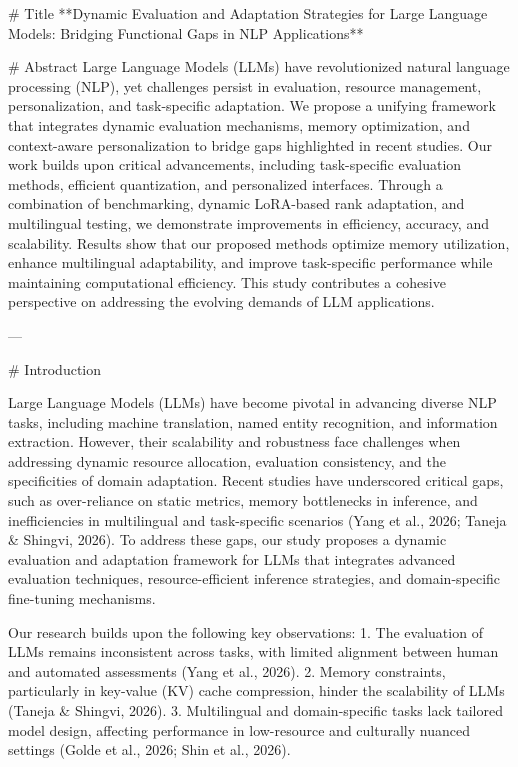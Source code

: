 # Title  
**Dynamic Evaluation and Adaptation Strategies for Large Language Models: Bridging Functional Gaps in NLP Applications**

# Abstract  
Large Language Models (LLMs) have revolutionized natural language processing (NLP), yet challenges persist in evaluation, resource management, personalization, and task-specific adaptation. We propose a unifying framework that integrates dynamic evaluation mechanisms, memory optimization, and context-aware personalization to bridge gaps highlighted in recent studies. Our work builds upon critical advancements, including task-specific evaluation methods, efficient quantization, and personalized interfaces. Through a combination of benchmarking, dynamic LoRA-based rank adaptation, and multilingual testing, we demonstrate improvements in efficiency, accuracy, and scalability. Results show that our proposed methods optimize memory utilization, enhance multilingual adaptability, and improve task-specific performance while maintaining computational efficiency. This study contributes a cohesive perspective on addressing the evolving demands of LLM applications.  

---

# Introduction  

Large Language Models (LLMs) have become pivotal in advancing diverse NLP tasks, including machine translation, named entity recognition, and information extraction. However, their scalability and robustness face challenges when addressing dynamic resource allocation, evaluation consistency, and the specificities of domain adaptation. Recent studies have underscored critical gaps, such as over-reliance on static metrics, memory bottlenecks in inference, and inefficiencies in multilingual and task-specific scenarios (Yang et al., 2026; Taneja & Shingvi, 2026). To address these gaps, our study proposes a dynamic evaluation and adaptation framework for LLMs that integrates advanced evaluation techniques, resource-efficient inference strategies, and domain-specific fine-tuning mechanisms.  

Our research builds upon the following key observations:  
1. The evaluation of LLMs remains inconsistent across tasks, with limited alignment between human and automated assessments (Yang et al., 2026).  
2. Memory constraints, particularly in key-value (KV) cache compression, hinder the scalability of LLMs (Taneja & Shingvi, 2026).  
3. Multilingual and domain-specific tasks lack tailored model design, affecting performance in low-resource and culturally nuanced settings (Golde et al., 2026; Shin et al., 2026).  

